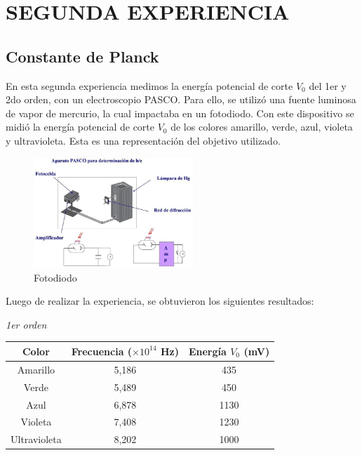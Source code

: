\documentclass[a4paper]{article}
\begin{document}
    \section{SEGUNDA EXPERIENCIA}
      \subsection{Constante de Planck}
      \indent En esta segunda experiencia medimos la energía potencial de corte $V_{0}$ del 1er y 2do orden, con un electroscopio PASCO. Para ello, se utilizó una fuente luminosa de vapor de mercurio, la cual impactaba en un fotodiodo. Con este dispositivo se midió la energía potencial de corte $V_{0}$ de los colores amarillo, verde, azul, violeta y ultravioleta. Esta es una representación del objetivo utilizado.

      \begin{figure}[h]
        \centering
        \includegraphics[width=6cm]{../imagenes/dispositivo_2daexperiencia.jpg}
        \caption{\small Fotodiodo}
      \end{figure}

      \indent Luego de realizar la experiencia, se obtuvieron los siguientes resultados:

      \begin{minipage}[c]{7.5cm}
        \vspace{5mm}
        \centering
        \textit{1er orden} 
        \vspace{2mm}
      \end{minipage}

      \begin{tabular}{ c c c }
        \toprule
        Color & Frecuencia ($\times 10^{14}$ Hz) & Energía $V_{0}$ (mV)\\
          \midrule
          Amarillo      & 5,186 & 435   \\
          Verde         & 5,489 & 450   \\
          Azul          & 6,878 & 1130  \\
          Violeta       & 7,408 & 1230  \\
          Ultravioleta  & 8,202 & 1000  \\
        \bottomrule
      \end{tabular}
\end{document}
